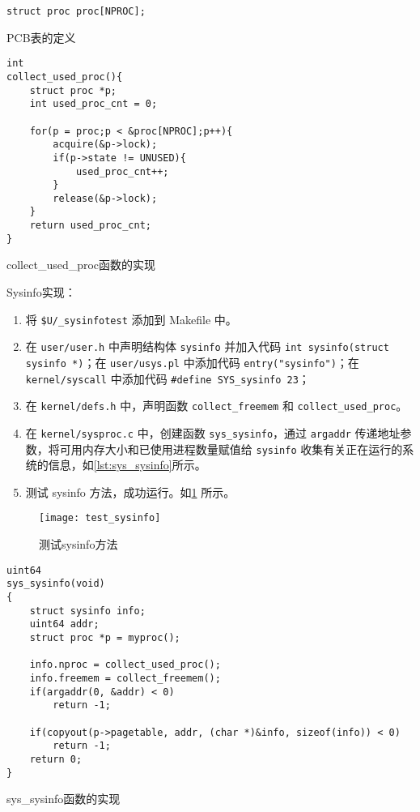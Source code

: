 \begin{listing}[!htb]
	\begin{verbatim}
struct proc proc[NPROC]; 
	\end{verbatim}
	\caption{PCB表的定义}\label{lst:proc_array}
\end{listing}

\begin{listing}[!htb]
	\begin{verbatim}
int
collect_used_proc(){
    struct proc *p;
    int used_proc_cnt = 0;

    for(p = proc;p < &proc[NPROC];p++){
        acquire(&p->lock);
        if(p->state != UNUSED){
            used_proc_cnt++;
        }
        release(&p->lock);
    }
    return used_proc_cnt;
}
	\end{verbatim}
	\caption{collect\_used\_proc函数的实现}\label{lst:collect_used_proc}
\end{listing}

Sysinfo实现：
\begin{enumerate}
	\item 将 \texttt{\$U/\_sysinfotest} 添加到 Makefile 中。
	\item 在 \texttt{user/user.h} 中声明结构体 \texttt{sysinfo} 并加入代码 \texttt{int sysinfo(struct sysinfo *)}；在 \texttt{user/usys.pl} 中添加代码 \texttt{entry("sysinfo")}；在 \texttt{kernel/syscall} 中添加代码 \texttt{\#define SYS\_sysinfo 23}；
	\item 在 \texttt{kernel/defs.h} 中，声明函数 \texttt{collect\_freemem} 和 \texttt{collect\_used\_proc}。
	\item 在 \texttt{kernel/sysproc.c} 中，创建函数 \texttt{sys\_sysinfo}，通过 \texttt{argaddr} 传递地址参数，将可用内存大小和已使用进程数量赋值给 \texttt{sysinfo} 收集有关正在运行的系统的信息，如\cref{lst:sys_sysinfo}所示。
	\item 测试 sysinfo 方法，成功运行。如\cref{fig:test_sysinfo} 所示。
\end{enumerate}

\begin{figure}[!htb]
	\centering
	\texttt{[image: test\_sysinfo]}
	\caption{测试sysinfo方法}
	\label{fig:test_sysinfo}
\end{figure}

\begin{listing}[!htb]
	\begin{verbatim}
uint64
sys_sysinfo(void)
{
    struct sysinfo info;
    uint64 addr;
    struct proc *p = myproc();

    info.nproc = collect_used_proc();
    info.freemem = collect_freemem();
    if(argaddr(0, &addr) < 0)
        return -1;
    
    if(copyout(p->pagetable, addr, (char *)&info, sizeof(info)) < 0)
        return -1; 
    return 0;
}
	\end{verbatim}
	\caption{sys\_sysinfo函数的实现}\label{lst:sys_sysinfo}
\end{listing}

